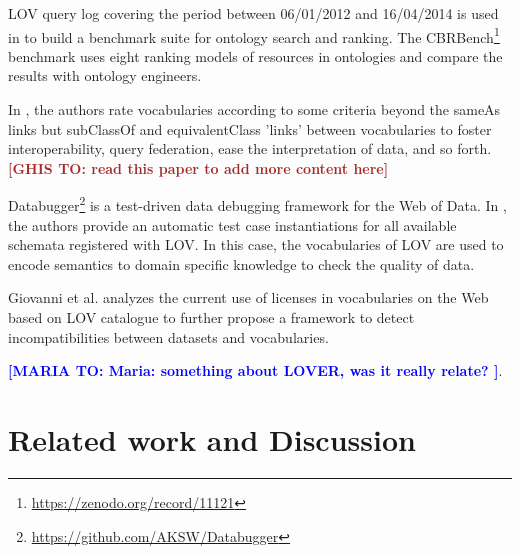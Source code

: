 \documentclass{iosart2c}
\newcommand{\maria}[1]{\textcolor{blue}{\textbf{[MARIA TO:#1]}}}
\newcommand{\ghis}[1]{\textcolor{brown}{\textbf{[GHIS TO:#1]}}}
\begin{document}
LOV query log covering the period between 06/01/2012 and 16/04/2014 is used in \cite{butt2014} to build a benchmark suite for ontology search and ranking. The CBRBench\footnote{\url{https://zenodo.org/record/11121}} benchmark uses eight ranking models of resources in ontologies and compare the results with ontology engineers.

In \cite{janowicz2014five}, the authors rate vocabularies according to some criteria beyond the sameAs links but subClassOf and equivalentClass 'links' between vocabularies to foster interoperability, query federation, ease the interpretation of data, and so forth. \ghis{ read this paper to add more content here}

Databugger\footnote{\url{https://github.com/AKSW/Databugger}} is a test-driven data debugging framework for the Web of Data. In \cite{databugger,rdfunit}, the authors provide an automatic test case instantiations for all available schemata registered with LOV. In this case, the vocabularies of LOV are used to encode semantics to domain specific knowledge to check the quality of data.

Giovanni et al. \cite{governatori2014} analyzes the current use of licenses in vocabularies on the Web based on LOV catalogue to further propose a framework to detect incompatibilities between datasets and vocabularies.

\maria{ Maria: something about LOVER, was it really relate? }. \\

\section{Related work and Discussion}
\label{sec:related}
\end{document}
